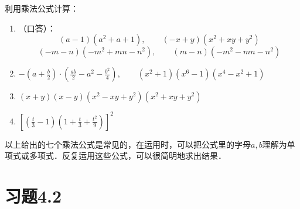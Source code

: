 \begin{ex}
  利用乘法公式计算：
\begin{enumerate}
    \item （口答）：
    \[(a-1)(a^2+a+1),\qquad (-x+y)(x^2+xy+y^2)\] 
    \[(-m-n)(-m^2+mn-n^2),\qquad (m-n)(-m^2-mn-n^2)\]
    \item $-\left(a+\frac{b}{2}\right)\cdot \left(\frac{ab}{2}-a^2-\frac{b^2}{4}\right),\qquad (x^2+1)(x^6-1)(x^4-x^2+1) $
    \item $(x+y)(x-y)(x^2-xy+y^2)(x^2+xy+y^2)$
    \item $\left[\left(\frac{t}{3}-1\right)\left(1+\frac{t}{3}+\frac{t^2}{9}\right) \right]^2$
\end{enumerate}
\end{ex}

以上给出的七个乘法公式是常见的，在运用时，可以把公式里的字母$a,b$理解为单项式或多项式．反复运用这些公式，可以很简明地求出结果．

\section*{习题4.2}


